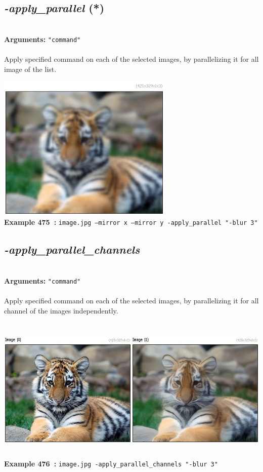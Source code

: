 \documentclass[a4paper,11pt,twoside]{book}
\begin{document}
\subsection{\emph{-apply\_parallel} (*)}\vspace*{-0.5em}
~\\\textbf{Arguments: } 
{\small \texttt{"command"}}\\~\\
Apply specified command on each of the selected images, by parallelizing it for all image of the list.
\begin{center}\includegraphics[keepaspectratio=true,height=7cm,width=\textwidth]{img/gmic_def475.jpg}\\
{\footnotesize \textbf{Example 475~:} \texttt{image.jpg --mirror x --mirror y -apply\_parallel "-blur 3"}}
\end{center}

\subsection{\emph{-apply\_parallel\_channels} }\vspace*{-0.5em}
~\\\textbf{Arguments: } 
{\small \texttt{"command"}}\\~\\
Apply specified command on each of the selected images, by parallelizing it for all channel of the images independently.
\begin{center}\includegraphics[keepaspectratio=true,height=7cm,width=\textwidth]{img/gmic_def476.jpg}\\
{\footnotesize \textbf{Example 476~:} \texttt{image.jpg -apply\_parallel\_channels "-blur 3"}}
\end{center}
\end{document}
